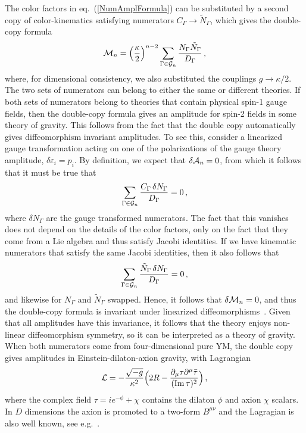 \documentclass[11pt,a4paper]{article}
\def\eqn#1{eq.~(\ref{#1})}
\begin{document}
The color factors in \eqn{NumAmplFormula} can be substituted by a second copy of color-kinematics satisfying numerators $C_\Gamma \rightarrow \tilde N_\Gamma$, which gives the double-copy formula~\cite{Bern:2008qj, Bern:2010ue}
\begin{equation}
    \mathcal{M}_n = \left(\frac{\kappa}{2}\right)^{n-2}\sum_{\Gamma\in{\cal G}_n}\frac{N_\Gamma\tilde N_\Gamma}{D_\Gamma} \,,
\end{equation}
where, for dimensional consistency, we also substituted the couplings $g\rightarrow \kappa/2$. The two sets of numerators can belong to either the same or different theories. 
If both sets of numerators belong to theories that contain physical spin-1 gauge fields, then the double-copy formula gives an amplitude for spin-2 fields in some theory of gravity. This follows from the fact that the double copy automatically gives diffeomorphism invariant amplitudes. To see this, consider a linearized gauge transformation acting on one of the polarizations of the gauge theory amplitude, $\delta \varepsilon_i = p_i$.  By definition, we expect that  $\delta {\cal A}_n = 0$, from which it follows that it must be true that  
\begin{equation}
 \sum_{\Gamma\in{\cal G}_n}\frac{C_\Gamma\, \delta N_\Gamma}{D_\Gamma}=0\,,
\end{equation}
where $\delta N_\Gamma$ are the gauge transformed numerators. The fact that this vanishes does not depend on the details of the color factors, only on the fact that they come from a Lie algebra and thus satisfy Jacobi identities. If we have kinematic numerators that satisfy the same Jacobi identities, then it also follows that~\cite{Bern:2008qj, Bern:2010ue,Chiodaroli:2017ngp}  
\begin{equation}
 \sum_{\Gamma\in{\cal G}_n}\frac{\tilde N_\Gamma\, \delta N_\Gamma}{D_\Gamma}=0\,,
\end{equation}
and likewise for $N_\Gamma$ and $\tilde N_\Gamma$ swapped. Hence, it follows that $\delta {\cal M}_n = 0$, and thus the double-copy formula is invariant under linearized diffeomorphisms~\cite{Chiodaroli:2017ngp}. Given that all amplitudes have this invariance, it follows that the theory enjoys non-linear diffeomorphism symmetry, so it can be interpreted as a theory of gravity. When both numerators come from four-dimensional pure YM, the double copy gives amplitudes in Einstein-dilaton-axion gravity, with Lagrangian~\cite{Bern:2019prr}
\begin{equation}
{\cal L} =-\frac{\sqrt{-g}}{\kappa^2}\Big(2R -\frac{\partial_\mu \tau \partial^\mu \bar \tau}{({\rm Im}\, \tau)^2}\Big)\,,
\end{equation}
where the complex field $\tau=ie^{-\phi} +\chi$ contains the dilaton $\phi$ and axion $\chi$ scalars. In $D$ dimensions the axion is promoted to a two-form $B^{\mu \nu}$ and the Lagragian is also well known, see e.g.~\cite{Bern:2019prr}. 
\end{document}
